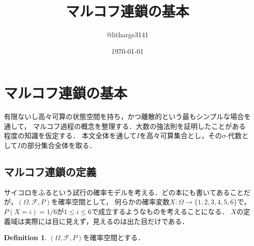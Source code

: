 \documentclass[dvipdfmx,autodetect-engine]{jsarticle}
\theoremstyle{remark}
\theoremstyle{definition}
\newtheorem{definition}{Definition}[section]
\begin{document}
\title{マルコフ連鎖の基本}
\author{@litharge3141}
\date{\today}
\maketitle

\section{マルコフ連鎖の基本}
有限ないし高々可算の状態空間を持ち，かつ離散的という最もシンプルな場合を通して，
マルコフ過程の概念を整理する．大数の強法則を証明したことがある程度の知識を仮定する．
本文全体を通して$I$を高々可算集合とし，その$\sigma$-代数として$I$の部分集合全体を取る．
\subsection{マルコフ連鎖の定義}
サイコロをふるという試行の確率モデルを考える．どの本にも書いてあることだが，$(\Omega,\mathcal{F},P)$を確率空間として，
何らかの確率変数$X:\Omega \to \{1,2,3,4,5,6\}$で，$P(X=i)=1/6$が$1\leq i\leq 6$で成立するようなものを考えることになる．
$X$の定義域は実際には目に見えず，見えるのは出た目だけである．

\begin{definition}
    $(\Omega,\mathcal{F},P)$を確率空間とする．
\end{definition}
\end{document}
